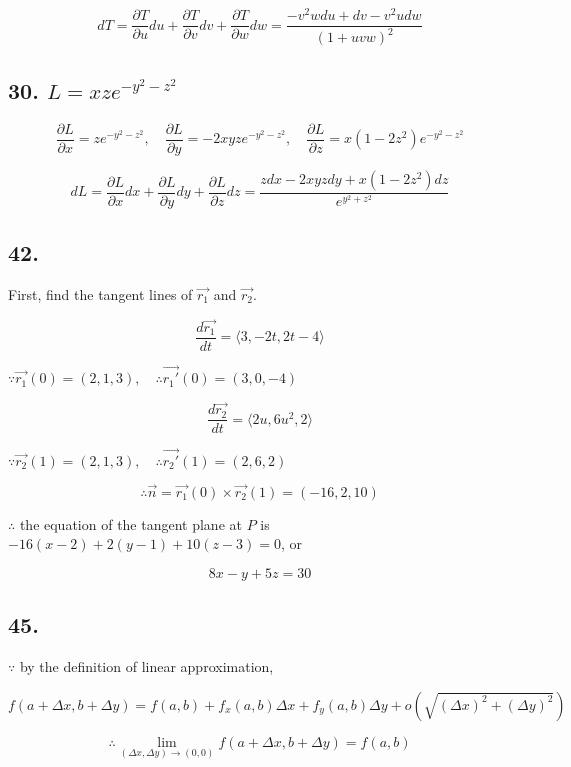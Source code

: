 \documentclass{article}
\begin{document}
    $$dT = \frac{\partial T}{\partial u} du + \frac{\partial T}{\partial v} dv + \frac{\partial T}{\partial w} dw = \frac{-v^2w du  + dv- v^2u dw}{(1+uvw)^2}$$

    \subsection*{30. $L = xze^{-y^2-z^2}$}

    $$\frac{\partial L}{\partial x} = ze^{-y^2-z^2}, \quad \frac{\partial L}{\partial y} = -2xyze^{-y^2-z^2}, \quad \frac{\partial L}{\partial z} = x(1 -2z^2)e^{-y^2-z^2}$$

    $$dL = \frac{\partial L}{\partial x} dx + \frac{\partial L}{\partial y} dy + \frac{\partial L}{\partial z} dz = \frac{zdx - 2xyzdy + x(1-2z^2)dz}{e^{y^2+z^2}}$$

    \subsection*{42.}
    
    First, find the tangent lines of $\overrightarrow{r_1}$ and $\overrightarrow{r_2}$.

    $$\frac{d\overrightarrow{r_1}}{dt} = \langle 3, -2t, 2t - 4 \rangle$$

    $\because \overrightarrow{r_1}(0) = (2, 1, 3), \quad \therefore \overrightarrow{r_1'}(0) = (3, 0, -4)$

    $$\frac{d\overrightarrow{r_2}}{dt} = \langle 2u, 6u^2, 2 \rangle$$

    $\because \overrightarrow{r_2}(1) = (2, 1, 3), \quad \therefore \overrightarrow{r_2'}(1) = (2, 6, 2)$

    $$\therefore \overrightarrow{n} = \overrightarrow{r_1}(0) \times \overrightarrow{r_2}(1) = (-16, 2, 10)$$

    $\therefore$ the equation of the tangent plane at $P$ is $-16(x-2) + 2(y-1) + 10(z-3) = 0$, or

    $$8x-y + 5z= 30$$
    
    \subsection*{45.}

    $\because$ by the definition of linear approximation, 

    $$f(a + \Delta x, b + \Delta y) = f(a, b) + f_x(a, b)\Delta x + f_y(a, b)\Delta y + o(\sqrt{(\Delta x)^2 + (\Delta y)^2})$$

    $$\therefore \lim_{(\Delta x, \Delta y) \to (0, 0)} f(a + \Delta x, b + \Delta y) = f(a, b)$$
\end{document}
